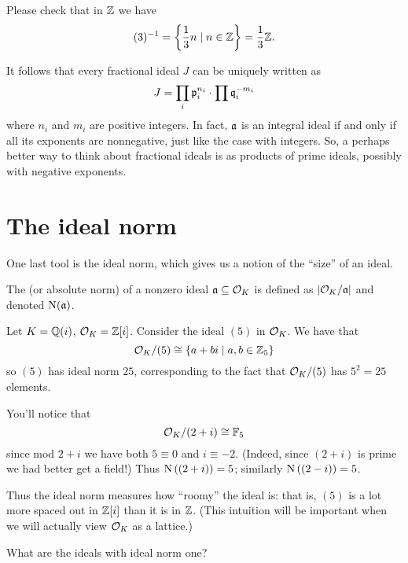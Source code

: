 \begin{example}[$(3)\inv$ in $\ZZ$]
	Please check that in $\ZZ$ we have
	\[ (3)\inv = \left\{ \frac 13 n \mid n \in \ZZ \right\} = \frac 13 \ZZ. \]
\end{example}

It follows that every fractional ideal $J$ can be uniquely written as
\[ J = \prod_i \pp_i^{n_i} \cdot \prod \qq_i^{-m_i} \]
where $n_i$ and $m_i$ are positive integers.
In fact, $\aa$ is an integral ideal if and only if all its exponents are nonnegative,
just like the case with integers.
So, a perhaps better way to think about fractional ideals is
as products of prime ideals, possibly with negative exponents.

\section{The ideal norm}
One last tool is the ideal norm,
which gives us a notion of the ``size'' of an ideal.
\begin{definition}
	The  (or absolute norm)
	of a nonzero ideal $\aa \subseteq \OO_K$ is defined as
	$\left\lvert \OO_K / \aa \right\rvert$ and denoted $\Norm(\aa)$.
\end{definition}
\begin{example}
	Let $K = \QQ(i)$, $\OO_K = \ZZ[i]$.
	Consider the ideal $(5)$ in $\OO_K$.
	We have that 
	\[ \OO_K / (5) \cong \{ a+bi \mid a,b \in \Zc5 \} \]
	so $(5)$ has ideal norm $25$,
	corresponding to the fact that $\OO_K/(5)$ has $5^2=25$ elements.
\end{example}

\begin{example}
	You'll notice that \[ \OO_K / (2+i) \cong \FF_5 \]
	since mod $2+i$ we have both $5 \equiv 0$ and $i \equiv -2$.
	(Indeed, since $(2+i)$ is prime we had better get a field!)
	Thus $\Norm\left( (2+i) \right) = 5$; similarly $\Norm\left( (2-i) \right) = 5$.
\end{example}

Thus the ideal norm measures how ``roomy'' the ideal is:
that is, $(5)$ is a lot more spaced out in $\ZZ[i]$ than it is in $\ZZ$.
(This intuition will be important when we will actually view $\OO_K$ as a lattice.)

\begin{ques}
	What are the ideals with ideal norm one?
\end{ques}

